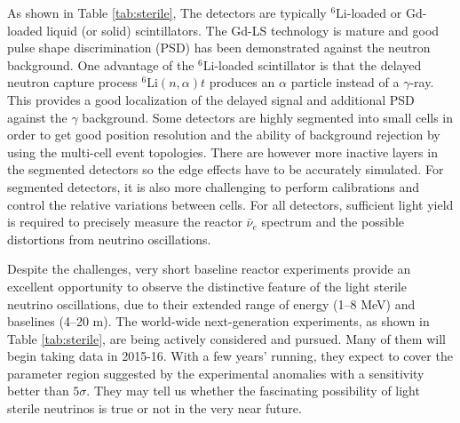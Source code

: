As shown in Table \ref{tab:sterile}, The detectors are typically $^{6}$Li-loaded or Gd-loaded liquid (or solid) scintillators. 
The Gd-LS technology is mature and good pulse shape discrimination (PSD) has been demonstrated against the neutron background. One advantage of the $^{6}$Li-loaded scintillator is that the delayed neutron capture process $^{6}$Li$(n,\alpha)t$ produces an $\alpha$ particle instead of a $\gamma$-ray. 
This provides a good localization of the delayed signal and additional PSD against the $\gamma$ background. 
Some detectors are highly segmented into small cells in order to get good position resolution and the ability of background rejection by using the multi-cell event topologies. 
There are however more inactive layers in the segmented detectors so the edge effects have to be accurately simulated.
For segmented detectors, it is also more challenging to perform calibrations and control the relative variations between cells. 
For all detectors, sufficient light yield is required to precisely measure the reactor $\bar\nu_e$ spectrum and the possible distortions from neutrino oscillations.


Despite the challenges, very short baseline reactor experiments provide an excellent opportunity to observe the distinctive feature of the light sterile neutrino oscillations, due to their extended range of energy (1--8 MeV) and baselines (4--20 m). 
The world-wide next-generation experiments, as shown in Table \ref{tab:sterile}, are being actively considered and pursued. 
Many of them will begin taking data \cite{Lhuillier-Neutrino14} in 2015-16. With a few years' running, they expect to cover the parameter region suggested by the experimental anomalies with a sensitivity better than $5\sigma$. 
They may tell us whether the fascinating possibility of light sterile neutrinos is true or not in the very near future.

